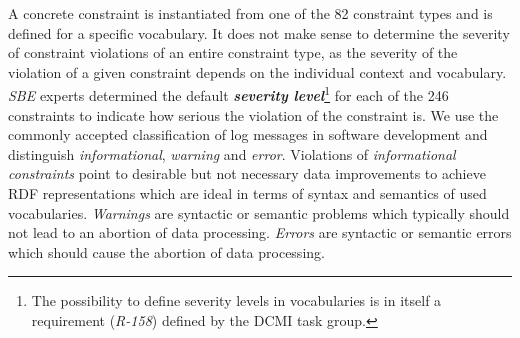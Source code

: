 \documentclass{llncs}
\newcommand{\ke}[1]{\todo[size=\small, color=red!40]{\textbf{Kai:} #1}}
\begin{document}
A concrete constraint is instantiated from one of the 82 constraint types and is defined for a specific vocabulary.
It does not make sense to determine the severity of constraint violations of an entire constraint type,
as the severity of the violation of a given constraint depends on the individual context and vocabulary.
\emph{SBE} experts determined the default \textbf{\emph{severity level}}\footnote{The possibility to define severity levels in vocabularies is in itself a requirement (\emph{R-158}) defined by the DCMI task group.} for each of the 246 constraints to indicate how serious the violation of the constraint is.
We use the commonly accepted classification of log messages in software development and distinguish \emph{informational}, \emph{warning} and \emph{error}.
Violations of \emph{informational constraints} point to desirable but not necessary data improvements to achieve RDF representations which are ideal in terms of syntax and semantics of used vocabularies. 
\emph{Warnings} are syntactic or semantic problems which typically should not lead to an abortion of data processing.
\emph{Errors} are syntactic or semantic errors which should cause the abortion of data processing. 
\end{document}
